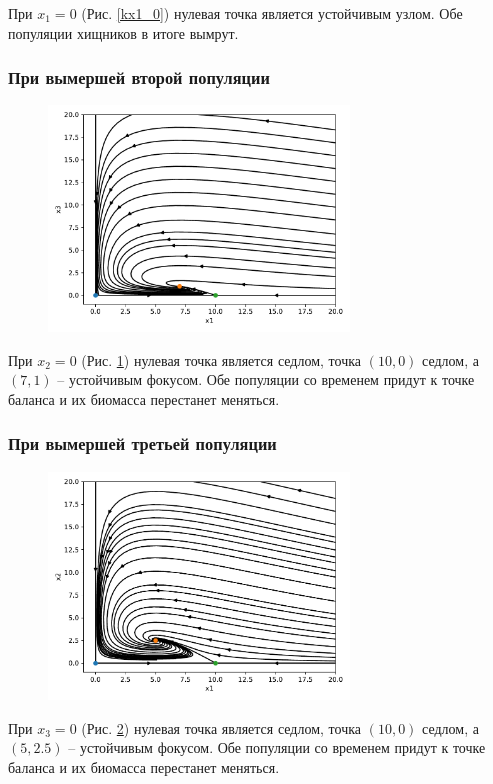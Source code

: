    При \(x_1 = 0\) (Рис. \ref{kx1_0}) нулевая точка является устойчивым узлом. Обе популяции хищников в итоге вымрут.

    \subsubsection{При вымершей второй популяции}

    \begin{figure}[H]
        \centering
        \includegraphics[width=8cm]{pictures/kx2_0vector.pdf}
        \caption{} \label{kx2_0}
    \end{figure}
    При \(x_2 = 0\) (Рис. \ref{kx2_0}) нулевая точка является седлом, точка \((10, 0)\) седлом, а \( \left( 7, 1 \right) \) -- устойчивым фокусом. Обе популяции со временем придут к точке баланса и их биомасса перестанет меняться.

    \subsubsection{При вымершей третьей популяции}

    \begin{figure}[H]
        \centering
        \includegraphics[width=8cm]{pictures/kx3_0vector.pdf}
        \caption{} \label{kx3_0}
    \end{figure}
    При \(x_3 = 0\) (Рис. \ref{kx3_0}) нулевая точка является седлом, точка \((10, 0)\) седлом, а \( \left( 5, 2.5 \right) \) -- устойчивым фокусом. Обе популяции со временем придут к точке баланса и их биомасса перестанет меняться.

